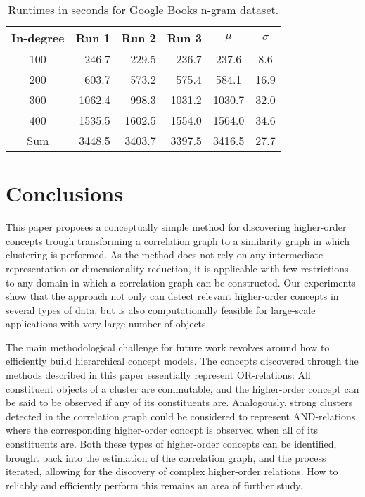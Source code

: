 \documentclass{sig-alternate}
\begin{document}
\begin{table}[h]
\begin{center}
\begin{tabular}{|c|r|r|r||c|c|}
  \hline In-degree  & Run 1
  & Run 2
  & Run 3
  & $\mu$
  & $\sigma$
  \\
  \hline 100
  & 246.7
  & 229.5
  & 236.7
  & 237.6
  & 8.6
  \\
  \hline 200
  & 603.7
  & 573.2
  & 575.4
  & 584.1
  & 16.9
  \\
  \hline 300
  & 1062.4
  & 998.3
  & 1031.2
  & 1030.7
  & 32.0
  \\
  \hline 400
  & 1535.5
  & 1602.5
  & 1554.0
  & 1564.0
  & 34.6
  \\
  \hline Sum & 3448.5
  & 3403.7
  & 3397.5
  & 3416.5
  & 27.7
  \\
  \hline
\end{tabular}
\end{center}
\caption{Runtimes in seconds for Google Books n-gram dataset.}
\label{tab:google_runtimes}
\end{table}

\section{Conclusions}

This paper proposes a conceptually simple method for discovering higher-order concepts trough transforming a
correlation graph to a similarity graph in which clustering is performed. As the method does not rely on any
intermediate representation or dimensionality reduction, it is applicable with few restrictions
to any domain in which a correlation graph can be constructed. Our experiments show that the approach not only can
detect relevant higher-order concepts in several types of data, but is also computationally feasible for large-scale
applications with very large number of objects.

The main methodological challenge for future work revolves around how to efficiently build hierarchical concept models.
The concepts discovered through the methods described in this paper essentially represent OR-relations: All constituent
objects of a cluster are commutable, and the higher-order concept can be said to be observed if any of its constituents
are. Analogously, strong clusters detected in the correlation graph could be considered to represent AND-relations,
where the corresponding higher-order concept is observed when all of its constituents are. Both these types of
higher-order concepts can be identified, brought back into the estimation of the correlation graph, and the process
iterated, allowing for the discovery of complex higher-order relations. How to reliably and efficiently perform this
remains an area of further study.
\end{document}

